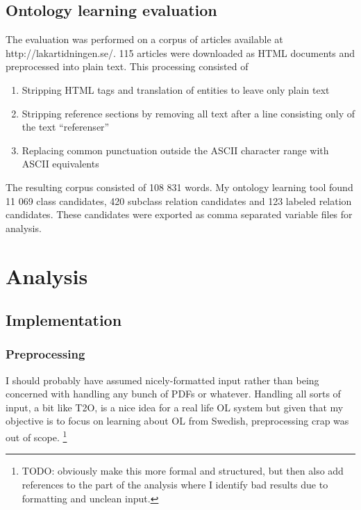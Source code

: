 \documentclass[a4paper]{report}
\newcommand{\todo}[1]{\footnote{{\color{red} TODO: #1}}}
\begin{document}
\section{Ontology learning evaluation}
\label{sec:results:eval}

The evaluation was performed on a corpus of articles available at http://lakartidningen.se/.
115 articles were downloaded as HTML documents and preprocessed into plain text.
This processing consisted of
\begin{enumerate}
\item Stripping HTML tags and translation of entities to leave only plain text
\item Stripping reference sections by removing all text after a line consisting only of the text ``referenser''
\item Replacing common punctuation outside the ASCII character range with ASCII equivalents
\end{enumerate}

The resulting corpus consisted of 108 831 words.
My ontology learning tool found 11 069 class candidates, 420 subclass relation candidates and 123 labeled relation candidates.
These candidates were exported as comma separated variable files for analysis.

\chapter{Analysis}
\label{chapter:analysis}

\section{Implementation}


\subsection{Preprocessing}

I should probably have assumed nicely-formatted input rather than being concerned with handling any bunch of PDFs or whatever.
Handling all sorts of input, a bit like T2O, is a nice idea for a real life OL system but given that my objective is to focus on learning about OL from Swedish, preprocessing crap was out of scope. 
\todo{obviously make this more formal and structured, but then also add references to the part of the analysis where I identify bad results due to formatting and unclean input.}
\end{document}
